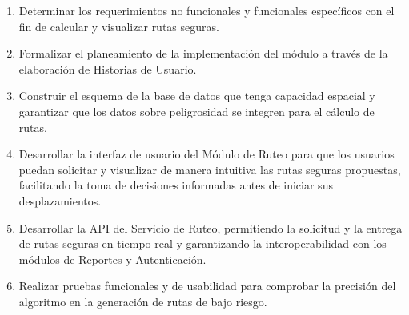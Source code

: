 \begin{enumerate}
\item Determinar los requerimientos no funcionales y funcionales específicos con el fin de calcular y visualizar rutas seguras.
\item Formalizar el planeamiento de la implementación del módulo a través de la elaboración de Historias de Usuario.
\item Construir el esquema de la base de datos que tenga capacidad espacial y garantizar que los datos sobre peligrosidad se integren para el cálculo de rutas.
\item Desarrollar la interfaz de usuario del Módulo de Ruteo para que los usuarios puedan solicitar y visualizar de manera intuitiva las rutas seguras propuestas, facilitando la toma de decisiones informadas antes de iniciar sus desplazamientos.
\item Desarrollar la API del Servicio de Ruteo, permitiendo la solicitud y la entrega de rutas seguras en tiempo real y garantizando la interoperabilidad con los módulos de Reportes y Autenticación.
\item Realizar pruebas funcionales y de usabilidad para comprobar la precisión del algoritmo en la generación de rutas de bajo riesgo.
\end{enumerate}